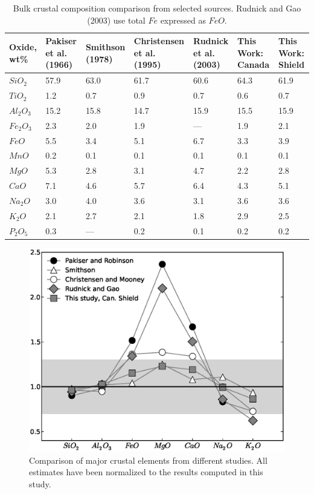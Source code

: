 \documentclass[review]{elsarticle}
\begin{document}
\begin{table}
  \begin{tabular}{ p{1.4cm} p{1.4cm} p{1.4cm} p{1.4cm} p{1.4cm} p{1.4cm} p{1.4cm}}
    \hline
    Oxide, wt\% & Pakiser et al. (1966) & Smithson (1978) & Christensen et al. (1995) & Rudnick et al. (2003) & This Work: Canada & This Work: Shield\\
    \hline
    $SiO_2$ & 57.9 & 63.0 & 61.7 & 60.6 & 64.3 & 61.9 \\
    $TiO_2$ & 1.2 & 0.7 & 0.9 & 0.7 & 0.6 & 0.7 \\
    $Al_2O_3$ & 15.2 & 15.8 & 14.7 & 15.9 & 15.5 & 15.9 \\
    $Fe_2O_3$ & 2.3 & 2.0 & 1.9 & --- & 1.9 & 2.1 \\
    $FeO$ & 5.5 & 3.4 & 5.1 & 6.7 & 3.3 & 3.9 \\
    $MnO$ & 0.2 & 0.1 & 0.1 & 0.1 & 0.1 & 0.1 \\
    $MgO$ & 5.3 & 2.8 & 3.1 & 4.7 & 2.2 & 2.8 \\
    $CaO$ & 7.1 & 4.6 & 5.7 & 6.4 & 4.3 & 5.1 \\
    $Na_2O$ & 3.0 & 4.0 & 3.6 & 3.1 & 3.6 & 3.6 \\
    $K_2O$ & 2.1 & 2.7 & 2.1 & 1.8 & 2.9 & 2.5 \\
    $P_2O_5$ & 0.3 & --- & 0.2 & 0.1 & 0.2 & 0.2 \\
    \hline
  \end{tabular}
  \caption{Bulk crustal composition comparison from selected sources. Rudnick and Gao (2003) use total $Fe$ expressed as $FeO$.}
\label{table:composition}

\end{table}

\begin{figure}
  \centering
  \includegraphics[width=\textwidth]{composition.eps}
  \caption{Comparison of major crustal elements from different studies. All estimates have been normalized to the results computed in this study.}
  \label{fig:composition}
\end{figure}
\end{document}
